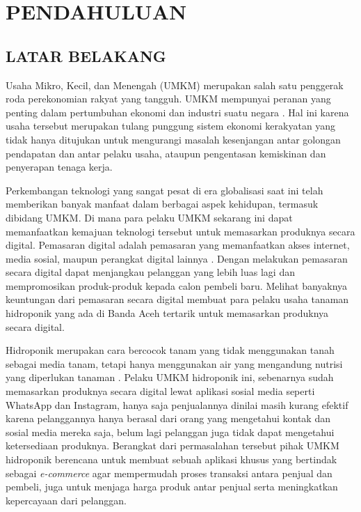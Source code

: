 \fancyhf{} 
\fancyfoot[C]{\thepage}

\chapter{PENDAHULUAN}

\section{\uppercase{LATAR BELAKANG}}
Usaha Mikro, Kecil, dan Menengah (UMKM) merupakan salah satu penggerak roda perekonomian rakyat yang tangguh. UMKM mempunyai peranan yang penting dalam pertumbuhan ekonomi dan industri suatu negara \citep{prastika2014pengaruh}. Hal ini karena usaha tersebut merupakan tulang punggung sistem ekonomi kerakyatan yang tidak hanya ditujukan untuk mengurangi masalah kesenjangan antar golongan pendapatan dan antar pelaku usaha, ataupun pengentasan kemiskinan dan penyerapan tenaga kerja.

\par Perkembangan teknologi yang sangat pesat di era globalisasi saat ini telah memberikan banyak manfaat dalam berbagai aspek kehidupan, termasuk dibidang UMKM. Di mana para pelaku UMKM sekarang ini dapat memanfaatkan kemajuan teknologi tersebut untuk memasarkan produknya secara digital. Pemasaran digital adalah pemasaran yang memanfaatkan akses internet, media sosial, maupun perangkat digital lainnya \citep{hardilawati2020strategi}. Dengan melakukan pemasaran secara digital dapat menjangkau pelanggan yang lebih luas lagi dan mempromosikan produk-produk kepada calon pembeli baru. Melihat banyaknya keuntungan dari pemasaran secara digital membuat para pelaku usaha tanaman hidroponik yang ada di Banda Aceh tertarik untuk memasarkan produknya secara digital.

\par Hidroponik merupakan cara bercocok tanam yang tidak menggunakan tanah sebagai media tanam, tetapi hanya menggunakan air yang mengandung nutrisi yang diperlukan tanaman \citep{prayitno2017sistem}. Pelaku UMKM hidroponik ini, sebenarnya sudah memasarkan produknya secara digital lewat aplikasi sosial media seperti WhatsApp dan Instagram, hanya saja penjualannya dinilai masih kurang efektif karena pelanggannya hanya berasal dari orang yang mengetahui kontak dan sosial media mereka saja, belum lagi pelanggan juga tidak dapat mengetahui ketersediaan produknya. Berangkat dari permasalahan tersebut pihak UMKM hidroponik berencana untuk membuat sebuah aplikasi khusus yang bertindak sebagai \textit{e-commerce} agar mempermudah proses transaksi antara penjual dan pembeli, juga untuk menjaga harga produk antar penjual serta meningkatkan kepercayaan dari pelanggan.

